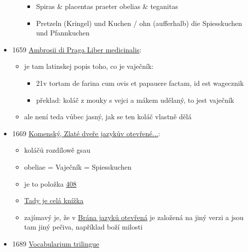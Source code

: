 \begin{itemize}
\begin{itemize}
    \begin{itemize}
    \tightlist
    \item
      Spiras \& placentas praeter obelias \& teganitas
    \item
      Pretzeln (Kringel) und Kuchen / ohn (aufferhalb) die Spiesskuchen
      und Pfannkuchen
    \end{itemize}
  \end{itemize}
\item
  1659
  \href{https://ceskadigitalniknihovna.cz/uuid/uuid:d380c040-c80a-11ea-b7a2-005056827e51}{Ambrosii
  di Praga Liber medicinalis}:

  \begin{itemize}
  \tightlist
  \item
    je tam latinskej popis toho, co je vaječník:

    \begin{itemize}
    \tightlist
    \item
      21v tortam de farina cum ovis et papauere factam, id est wagecznik
    \item
      překlad: koláč z mouky s vejci a mákem udělaný, to jest vaječník
    \end{itemize}
  \item
    ale není teda vůbec jasný, jak se ten koláč vlastně dělá
  \end{itemize}
\item
  1669
  \href{https://vokabular.ujc.cas.cz/moduly/mluvnice/digitalni-kopie-detail/KomJanua1669/strana-76}{Komenský,
  Zlaté dveře jazykův otevřené...}:

  \begin{itemize}
  \tightlist
  \item
    koláčů rozdílowě gsau
  \item
    obeliae = Vaječník = Spiesskuchen
  \item
    je to položka
    \href{https://vokabular.ujc.cas.cz/moduly/mluvnice/digitalni-kopie-detail/KomJanua1669/strana-76}{408}
  \item
    \href{https://vokabular.ujc.cas.cz/moduly/mluvnice/digitalni-kopie-info/KomJanua1669}{Tady
    je celá knížka}
  \item
    zajímavý je, že v
    \href{https://www.digitalniknihovna.cz/mzk/uuid/uuid:c53f79b0-b747-11e4-a7a2-005056827e51}{Brána
    jazyků otevřená} je založená na jiný verzi a jsou tam jiný pečiva,
    například boží milosti
  \end{itemize}
\item
  1689
  \href{https://www.digitale-sammlungen.de/view/bsb11105115?page=42\%2C43}{Vocabularium
  trilingue}


\end{itemize}

